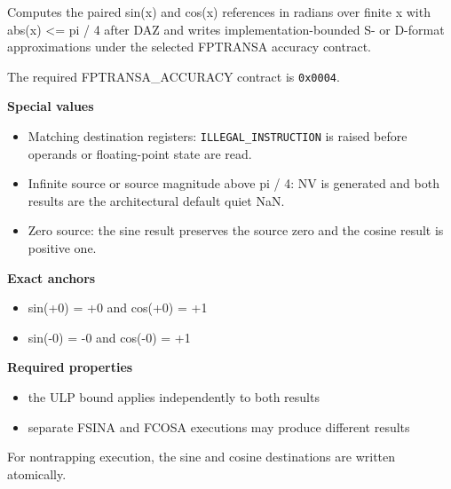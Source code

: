 Computes the paired sin(x) and cos(x) references in radians over finite x with abs(x) \textless{}= pi / 4 after DAZ and writes implementation-bounded S- or D-format approximations under the selected FPTRANSA accuracy contract.

The required FPTRANSA\_ACCURACY contract is \texttt{0x0004}.

\textbf{Special values}\par
\begin{itemize}
\item Matching destination registers: \texttt{ILLEGAL\_INSTRUCTION} is raised before operands or floating-point state are read.
\item Infinite source or source magnitude above pi / 4: NV is generated and both results are the architectural default quiet NaN.
\item Zero source: the sine result preserves the source zero and the cosine result is positive one.
\end{itemize}

\textbf{Exact anchors}\par
\begin{itemize}
\item sin(+0) = +0 and cos(+0) = +1
\item sin(-0) = -0 and cos(-0) = +1
\end{itemize}

\textbf{Required properties}\par
\begin{itemize}
\item the ULP bound applies independently to both results
\item separate FSINA and FCOSA executions may produce different results
\end{itemize}

For nontrapping execution, the sine and cosine destinations are written atomically.
